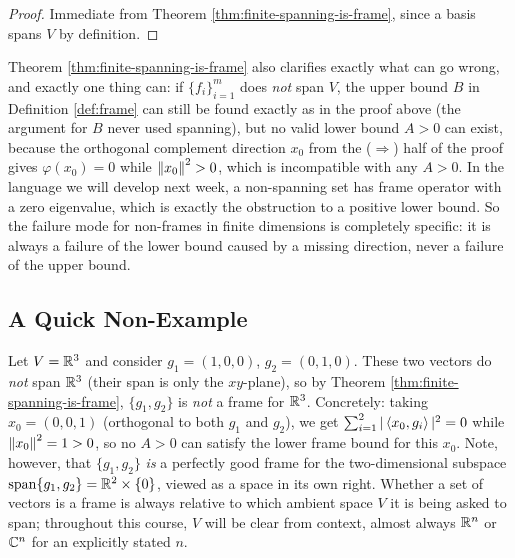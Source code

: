 \begin{proof}
Immediate from Theorem \ref{thm:finite-spanning-is-frame}, since a basis spans $V$ by definition.
\end{proof}

\begin{remark*}
Theorem \ref{thm:finite-spanning-is-frame} also clarifies exactly what can go wrong, and exactly one thing can: if $\{f_i\}_{i=1}^m$ does \emph{not} span $V$, the upper bound $B$ in Definition \ref{def:frame} can still be found exactly as in the proof above (the argument for $B$ never used spanning), but no valid lower bound $A > 0$ can exist, because the orthogonal complement direction $x_0$ from the ($\Rightarrow$) half of the proof gives $\varphi(x_0) = 0$ while $\left\| x_0 \right\|^2 > 0$, which is incompatible with any $A > 0$. In the language we will develop next week, a non-spanning set has frame operator with a zero eigenvalue, which is exactly the obstruction to a positive lower bound. So the failure mode for non-frames in finite dimensions is completely specific: it is always a failure of the lower bound caused by a missing direction, never a failure of the upper bound.
\end{remark*}

\subsection{A Quick Non-Example}
\label{subsec:non-example}

\begin{examplebox}[title={Example 2.4: A spanning failure}]
\label{ex:non-frame}
Let $V = \mathbb{R}^3$ and consider $g_1 = (1,0,0)$, $g_2 = (0,1,0)$. These two vectors do \emph{not} span $\mathbb{R}^3$ (their span is only the $xy$-plane), so by Theorem \ref{thm:finite-spanning-is-frame}, $\{g_1, g_2\}$ is \emph{not} a frame for $\mathbb{R}^3$. Concretely: taking $x_0 = (0,0,1)$ (orthogonal to both $g_1$ and $g_2$), we get $\sum_{i=1}^2 |\left\langle x_0, g_i \right\rangle|^2 = 0$ while $\left\| x_0 \right\|^2 = 1 > 0$, so no $A > 0$ can satisfy the lower frame bound for this $x_0$. Note, however, that $\{g_1, g_2\}$ \emph{is} a perfectly good frame for the two-dimensional subspace $\operatorname{span}\{g_1, g_2\} = \mathbb{R}^2 \times \{0\}$, viewed as a space in its own right. Whether a set of vectors is a frame is always relative to which ambient space $V$ it is being asked to span; throughout this course, $V$ will be clear from context, almost always $\mathbb{R}^n$ or $\mathbb{C}^n$ for an explicitly stated $n$.
\end{examplebox}

